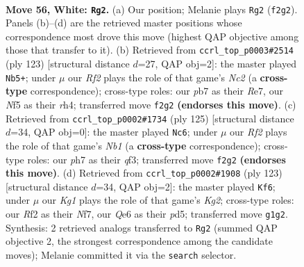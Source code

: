 \documentclass[11pt]{article}
\begin{document}
\clearpage

\begin{figure}[p]\centering
\begin{subfigure}{0.46\textwidth}\centering
\resizebox{\linewidth}{!}{%
\newchessgame
\chessboard[
  setfen={5k2/1p5p/4Q3/5N1p/8/8/5R2/6K1 w - - 1 56},
  showmover=false,
  pgfstyle=straightmove, color=movearrow, markmove={f2-g2}
]}
\caption{}
\end{subfigure}\hfill
\begin{subfigure}{0.46\textwidth}\centering
\resizebox{\linewidth}{!}{%
\newchessgame
\chessboard[
  setfen={8/2n1r3/2k5/8/7R/K1P2P1P/8/8 b - - 0 62},
  showmover=false,
  pgfstyle=straightmove, color=movearrow, markmove={c7-b5}
]}
\caption{}
\end{subfigure}
\\[4pt]
\begin{subfigure}{0.46\textwidth}\centering
\resizebox{\linewidth}{!}{%
\newchessgame
\chessboard[
  setfen={1n6/2k5/8/2q5/8/5Q2/KP6/8 b - - 5 63},
  showmover=false,
  pgfstyle=straightmove, color=movearrow, markmove={b8-c6}
]}
\caption{}
\end{subfigure}\hfill
\begin{subfigure}{0.46\textwidth}\centering
\resizebox{\linewidth}{!}{%
\newchessgame
\chessboard[
  setfen={8/5nk1/3p2n1/3P4/4P1K1/R7/7P/8 b - - 12 62},
  showmover=false,
  pgfstyle=straightmove, color=movearrow, markmove={g7-f6}
]}
\caption{}
\end{subfigure}
\caption{\textbf{Move 56, White: \texttt{Rg2}.} (a) Our position; Melanie plays \texttt{Rg2} (\texttt{f2g2}). Panels (b)--(d) are the retrieved master positions whose correspondence most drove this move (highest QAP objective among those that transfer to it). (b) Retrieved from \texttt{ccrl\_top\_p0003\#2514} (ply 123) [structural distance $d$=27, QAP obj=2]: the master played \texttt{Nb5+}; under $\mu$ our \emph{Rf2} plays the role of that game's \emph{Nc2} (a \textbf{cross-type} correspondence); cross-type roles: our \emph{p}b7 as their \emph{R}e7, our \emph{N}f5 as their \emph{r}h4; transferred move \texttt{f2g2} \textbf{(endorses this move)}. (c) Retrieved from \texttt{ccrl\_top\_p0002\#1734} (ply 125) [structural distance $d$=34, QAP obj=0]: the master played \texttt{Nc6}; under $\mu$ our \emph{Rf2} plays the role of that game's \emph{Nb1} (a \textbf{cross-type} correspondence); cross-type roles: our \emph{p}h7 as their \emph{q}f3; transferred move \texttt{f2g2} \textbf{(endorses this move)}. (d) Retrieved from \texttt{ccrl\_top\_p0002\#1908} (ply 123) [structural distance $d$=34, QAP obj=2]: the master played \texttt{Kf6}; under $\mu$ our \emph{Kg1} plays the role of that game's \emph{Kg2}; cross-type roles: our \emph{R}f2 as their \emph{N}f7, our \emph{Q}e6 as their \emph{p}d5; transferred move \texttt{g1g2}. Synthesis: 2 retrieved analogs transferred to \texttt{Rg2} (summed QAP objective 2, the strongest correspondence among the candidate moves); Melanie committed it via the \texttt{search} selector.}
\label{fig:thought-m110}
\end{figure}
\end{document}
